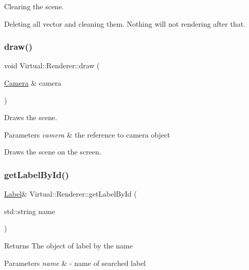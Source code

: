 Clearing the scene. 

Deleting all vector and cleaning them. Nothing will not rendering after that. \hypertarget{class_virtual_1_1_renderer_ae1151907121db309b9d1b650b3dbe076}{}\label{class_virtual_1_1_renderer_ae1151907121db309b9d1b650b3dbe076} 
\subsubsection{\texorpdfstring{draw()}{draw()}}
{\footnotesize\ttfamily void Virtual\+::\+Renderer\+::draw (\begin{DoxyParamCaption}\item[{\hyperlink{class_virtual_1_1_camera}{Camera} \&}]{camera }\end{DoxyParamCaption})}



Draws the scene. 


\begin{DoxyParams}{Parameters}
{\em camera} & the reference to camera object\\
\hline
\end{DoxyParams}
Draws the scene on the screen. \hypertarget{class_virtual_1_1_renderer_a11f3dbe70c634fb465b5b21d43618f5d}{}\label{class_virtual_1_1_renderer_a11f3dbe70c634fb465b5b21d43618f5d} 
\subsubsection{\texorpdfstring{get\+Label\+By\+Id()}{getLabelById()}}
{\footnotesize\ttfamily \hyperlink{class_virtual_1_1_label}{Label}\& Virtual\+::\+Renderer\+::get\+Label\+By\+Id (\begin{DoxyParamCaption}\item[{std\+::string}]{name }\end{DoxyParamCaption})}

\begin{DoxyReturn}{Returns}
The object of label by the name
\end{DoxyReturn}

\begin{DoxyParams}{Parameters}
{\em name} & -\/ name of searched label \\
\hline
\end{DoxyParams}
\hypertarget{class_virtual_1_1_renderer_aaa8e493c4e05d5eaca42604555d3b419}{}\label{class_virtual_1_1_renderer_aaa8e493c4e05d5eaca42604555d3b419} 
